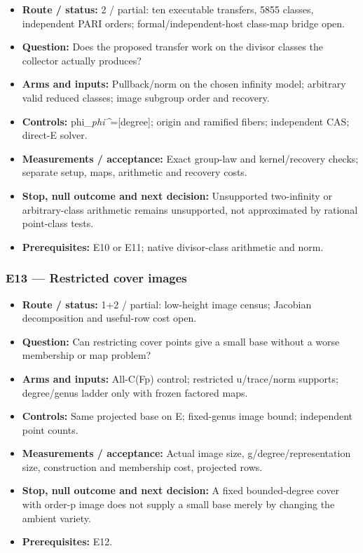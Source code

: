 \documentclass[
  10pt,
]{article}
\providecommand{\tightlist}{%
  \setlength{\itemsep}{0pt}\setlength{\parskip}{0pt}}
\begin{document}
\begin{itemize}
\tightlist
\item
  \textbf{Route / status:} 2 / partial: ten executable transfers, 5855
  classes, independent PARI orders; formal/independent-host class-map
  bridge open.
\item
  \textbf{Question:} Does the proposed transfer work on the divisor
  classes the collector actually produces?
\item
  \textbf{Arms and inputs:} Pullback/norm on the chosen infinity model;
  arbitrary valid reduced classes; image subgroup order and recovery.
\item
  \textbf{Controls:} phi\_\emph{phi\^{}}={[}degree{]}; origin and
  ramified fibers; independent CAS; direct-E solver.
\item
  \textbf{Measurements / acceptance:} Exact group-law and
  kernel/recovery checks; separate setup, maps, arithmetic and recovery
  costs.
\item
  \textbf{Stop, null outcome and next decision:} Unsupported
  two-infinity or arbitrary-class arithmetic remains unsupported, not
  approximated by rational point-class tests.
\item
  \textbf{Prerequisites:} E10 or E11; native divisor-class arithmetic
  and norm.
\end{itemize}

\subsubsection{E13 --- Restricted cover
images}\label{e13-restricted-cover-images}

\begin{itemize}
\tightlist
\item
  \textbf{Route / status:} 1+2 / partial: low-height image census;
  Jacobian decomposition and useful-row cost open.
\item
  \textbf{Question:} Can restricting cover points give a small base
  without a worse membership or map problem?
\item
  \textbf{Arms and inputs:} All-C(Fp) control; restricted u/trace/norm
  supports; degree/genus ladder only with frozen factored maps.
\item
  \textbf{Controls:} Same projected base on E; fixed-genus image bound;
  independent point counts.
\item
  \textbf{Measurements / acceptance:} Actual image size,
  g/degree/representation size, construction and membership cost,
  projected rows.
\item
  \textbf{Stop, null outcome and next decision:} A fixed bounded-degree
  cover with order-p image does not supply a small base merely by
  changing the ambient variety.
\item
  \textbf{Prerequisites:} E12.
\end{itemize}
\end{document}
